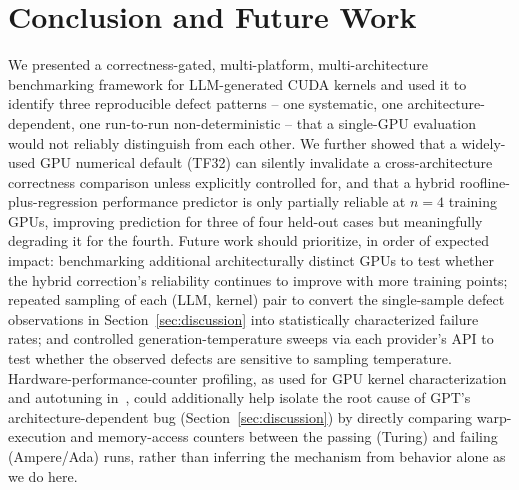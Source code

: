\documentclass[conference]{IEEEtran}
\begin{document}
\section{Conclusion and Future Work}

We presented a correctness-gated, multi-platform, multi-architecture benchmarking framework for
LLM-generated CUDA kernels and used it to identify three reproducible defect patterns -- one
systematic, one architecture-dependent, one run-to-run non-deterministic -- that a single-GPU
evaluation would not reliably distinguish from each other. We further showed that a widely-used
GPU numerical default (TF32) can silently invalidate a cross-architecture correctness comparison
unless explicitly controlled for, and that a hybrid roofline-plus-regression performance predictor
is only partially reliable at $n=4$ training GPUs, improving prediction for three of four held-out
cases but meaningfully degrading it for the fourth. Future work should prioritize, in order of
expected impact: benchmarking additional architecturally distinct GPUs to test whether the hybrid
correction's reliability continues to improve with more training points; repeated sampling of each
(LLM, kernel) pair to convert the single-sample defect observations in
Section~\ref{sec:discussion} into statistically characterized failure rates; and controlled
generation-temperature sweeps via each provider's API to test whether the observed defects are
sensitive to sampling temperature. Hardware-performance-counter profiling, as used for GPU kernel
characterization and autotuning in~\cite{hwcounters1,hwcounters2}, could additionally help isolate
the root cause of GPT's architecture-dependent bug (Section~\ref{sec:discussion}) by directly
comparing warp-execution and memory-access counters between the passing (Turing) and failing
(Ampere/Ada) runs, rather than inferring the mechanism from behavior alone as we do here.
\end{document}
